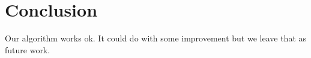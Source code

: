 \section{Conclusion}

Our algorithm works ok.
It could do with some improvement but we leave that as future work.
